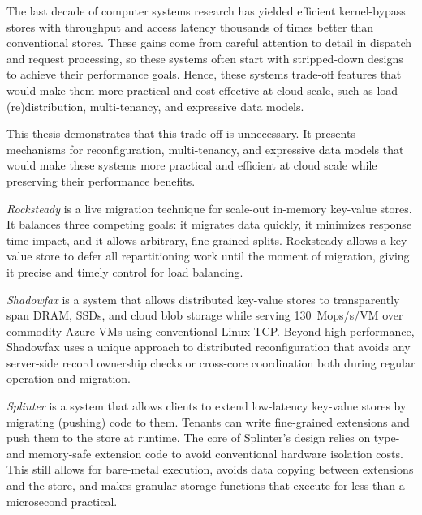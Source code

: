The last decade of computer systems research has yielded efficient
kernel-bypass stores with throughput and access latency thousands
of times better than conventional stores.
%
These gains come from careful attention to detail in dispatch and
request processing,
so these systems often start with stripped-down designs to
achieve their performance goals.
%
Hence, these systems trade-off
features that
would make them more practical and cost-effective at cloud scale,
such as load (re)distribution, multi-tenancy, and
expressive data models.

This thesis demonstrates that this trade-off is unnecessary.
It presents mechanisms for
reconfiguration, multi-tenancy, and expressive data
models that
would make these systems more practical and
efficient at cloud scale while preserving their performance
benefits.

\emph{Rocksteady}
is a live migration technique for scale-out
in-memory key-value stores.
%
It balances three competing goals: it
migrates data quickly, it minimizes response time impact, and it
allows arbitrary, fine-grained splits.
%
Rocksteady allows a key-value store to defer all repartitioning work
until the moment of migration, giving it precise and timely control for
load balancing.

\emph{Shadowfax} is
a system that
allows distributed key-value stores to
transparently span DRAM, SSDs, and cloud blob storage while serving
130~Mops/s/VM over commodity Azure VMs using conventional Linux TCP.
%
Beyond
high performance, Shadowfax uses a unique approach to distributed
reconfiguration that avoids any server-side record ownership checks
or cross-core coordination both during regular operation and migration.

\emph{Splinter} is a system that
allows clients
to extend low-latency key-value stores by migrating (pushing) code to them.
%
Tenants can write
fine-grained extensions and push
them to the store at runtime.
%
The core of
Splinter's design relies on type- and memory-safe
extension code to avoid conventional hardware isolation costs.
%
This
still allows for bare-metal execution, avoids data copying between
extensions and the store, and makes granular storage functions that
execute for less than
a microsecond practical.
